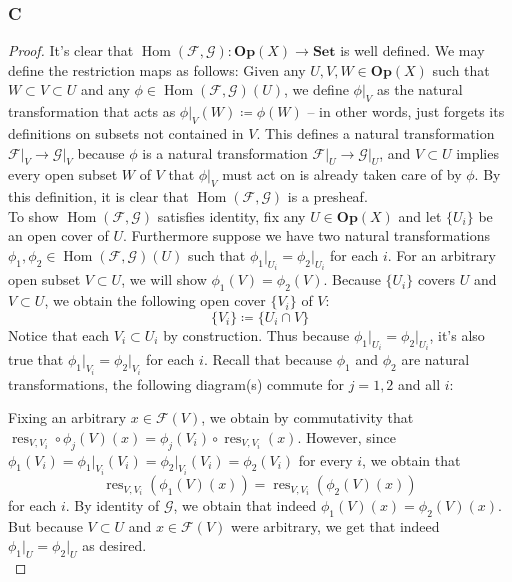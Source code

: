 \documentclass{article}
\newcommand{\fF}{\mathscr{F}}
\newcommand{\fG}{\mathscr{G}}
\newcommand{\Set}{\mathbf{Set}} %
\newcommand{\Op}{\mathbf{Op}} %
\DeclareMathOperator{\res}{\mathrm{res}}
\DeclareMathOperator{\Hom}{\mathrm{Hom}}
\begin{document}
\subsubsection{C}\label{2.3.C}
\begin{proof}
    It's clear that $\Hom(\fF,\fG):\Op(X)\to \Set$ is well defined. We may define the restriction maps as follows: Given any $U,V,W\in \Op(X)$ such that $W\subset V\subset U$ and any $\phi\in \Hom(\fF,\fG)(U)$, we define $\phi\vert_{V}$ as the natural transformation that acts as $\phi\vert_{V}(W)\coloneqq \phi(W)$ -- in other words, just forgets its definitions on subsets not contained in $V$. This defines a natural transformation $\fF\vert_{V}\to \fG\vert_{V}$ because $\phi$ is a natural transformation $\fF\vert_{U}\to \fG\vert_{U}$, and $V\subset U$ implies every open subset $W$ of $V$ that $\phi\vert_{V}$ must act on is already taken care of by $\phi$. By this definition, it is clear that $\Hom(\fF,\fG)$ is a presheaf.\\
    \indent To show $\Hom(\fF,\fG)$ satisfies identity, fix any $U\in \Op(X)$ and let $\{U_i\}$ be an open cover of $U$. Furthermore suppose we have two natural transformations $\phi_1,\phi_2\in \Hom(\fF,\fG)(U)$ such that $\phi_1\vert_{U_i}=\phi_2\vert_{U_i}$ for each $i$. For an arbitrary open subset $V\subset U$, we will show $\phi_1(V)=\phi_2(V)$. Because $\{U_i\}$ covers $U$ and $V\subset U$, we obtain the following open cover $\{V_i\}$ of $V$:
    \[
    \{V_i\}\coloneqq \{U_i\cap V\}
    \]
    Notice that each $V_i\subset U_i$ by construction. Thus because $\phi_1\vert_{U_i}=\phi_2\vert_{U_i}$, it's also true that $\phi_1\vert_{V_i}=\phi_2\vert_{V_i}$ for each $i$. Recall that because $\phi_1$ and $\phi_2$ are natural transformations, the following diagram(s) commute for $j=1,2$ and all $i$:
    \begin{center}
    \end{center}
    Fixing an arbitrary $x\in \fF(V)$, we obtain by commutativity that $\res_{V,V_i}\circ \phi_j(V)(x)=\phi_j(V_i)\circ \res_{V,V_i}(x)$. However, since $\phi_1(V_i)=\phi_1\vert_{V_i}(V_i)=\phi_2\vert_{V_i}(V_i)=\phi_2(V_i)$ for every $i$, we obtain that 
    \[
    \res_{V,V_i}( \phi_1(V)(x))=\res_{V,V_i}(\phi_2(V)(x))
    \]
    for each $i$. By identity of $\fG$, we obtain that indeed $\phi_1(V)(x)=\phi_2(V)(x)$. But because $V\subset U$ and $x\in \fF(V)$ were arbitrary, we get that indeed $\phi_1\vert_{U}=\phi_2\vert_{U}$ as desired.\\

\end{proof}
\end{document}
